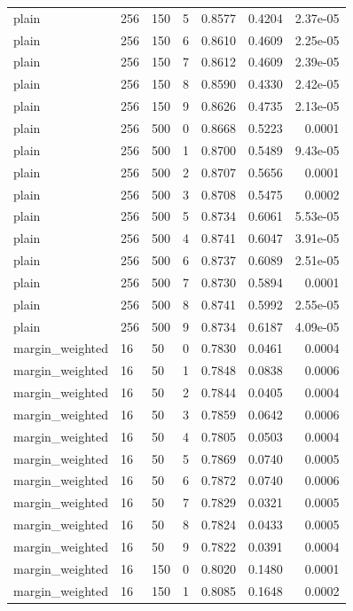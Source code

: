 \begin{footnotesize}
\begin{longtable}{lllrrrr}
plain & 256 & 150 & 5 & 0.8577 & 0.4204 & 2.37e-05 \\
plain & 256 & 150 & 6 & 0.8610 & 0.4609 & 2.25e-05 \\
plain & 256 & 150 & 7 & 0.8612 & 0.4609 & 2.39e-05 \\
plain & 256 & 150 & 8 & 0.8590 & 0.4330 & 2.42e-05 \\
plain & 256 & 150 & 9 & 0.8626 & 0.4735 & 2.13e-05 \\
plain & 256 & 500 & 0 & 0.8668 & 0.5223 & 0.0001 \\
plain & 256 & 500 & 1 & 0.8700 & 0.5489 & 9.43e-05 \\
plain & 256 & 500 & 2 & 0.8707 & 0.5656 & 0.0001 \\
plain & 256 & 500 & 3 & 0.8708 & 0.5475 & 0.0002 \\
plain & 256 & 500 & 5 & 0.8734 & 0.6061 & 5.53e-05 \\
plain & 256 & 500 & 4 & 0.8741 & 0.6047 & 3.91e-05 \\
plain & 256 & 500 & 6 & 0.8737 & 0.6089 & 2.51e-05 \\
plain & 256 & 500 & 7 & 0.8730 & 0.5894 & 0.0001 \\
plain & 256 & 500 & 8 & 0.8741 & 0.5992 & 2.55e-05 \\
plain & 256 & 500 & 9 & 0.8734 & 0.6187 & 4.09e-05 \\
margin\_weighted & 16 & 50 & 0 & 0.7830 & 0.0461 & 0.0004 \\
margin\_weighted & 16 & 50 & 1 & 0.7848 & 0.0838 & 0.0006 \\
margin\_weighted & 16 & 50 & 2 & 0.7844 & 0.0405 & 0.0004 \\
margin\_weighted & 16 & 50 & 3 & 0.7859 & 0.0642 & 0.0006 \\
margin\_weighted & 16 & 50 & 4 & 0.7805 & 0.0503 & 0.0004 \\
margin\_weighted & 16 & 50 & 5 & 0.7869 & 0.0740 & 0.0005 \\
margin\_weighted & 16 & 50 & 6 & 0.7872 & 0.0740 & 0.0006 \\
margin\_weighted & 16 & 50 & 7 & 0.7829 & 0.0321 & 0.0005 \\
margin\_weighted & 16 & 50 & 8 & 0.7824 & 0.0433 & 0.0005 \\
margin\_weighted & 16 & 50 & 9 & 0.7822 & 0.0391 & 0.0004 \\
margin\_weighted & 16 & 150 & 0 & 0.8020 & 0.1480 & 0.0001 \\
margin\_weighted & 16 & 150 & 1 & 0.8085 & 0.1648 & 0.0002 \\

\end{longtable}
\end{footnotesize}
